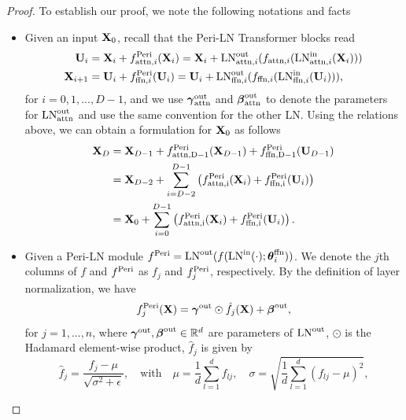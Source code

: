 \documentclass[journal]{IEEEtran}
\newcommand{\bfU}{{\bf U}}
\newcommand{\bfX}{{\bf X}}
\newcommand{\bftheta}{{\boldsymbol \theta}}
\newcommand{\bfgamma}{{\boldsymbol \gamma}}
\newcommand{\bfbeta}{{\boldsymbol \beta}}
\theoremstyle{plain}
\theoremstyle{definition}
\theoremstyle{remark}
\begin{document}
\begin{proof}
    To establish our proof, we note the following notations and facts
    \begin{itemize}
    \item Given an input $\bfX_0$, recall that the Peri-LN Transformer blocks read
        \begin{align}
        \bfU_{i} &= \bfX_i + f_{{\rm attn}, i}^{\rm Peri}(\bfX_i) = \bfX_i + {\rm LN}^{\rm out}_{{\rm attn}, i}(f_{{\rm attn}, i}({\rm LN}^{\rm in}_{{\rm attn}, i}(\bfX_i))) \\
     \bfX_{i+1} &= \bfU_{i} + f_{{\rm ffn}, i}^{\rm Peri}(\bfU_{i}) = \bfU_{i} + {\rm LN}_{{\rm ffn}, i}^{\rm out}(f_{{\rm ffn}, i}({\rm LN}_{{\rm ffn}, i}^{\rm in}(\bfU_{i}))), 
     \end{align}
     for $i=0,1,...,D-1$, and we use $\bfgamma^{\rm out}_{\rm attn}$ and $\bfbeta^{\rm out}_{\rm attn}$ to denote the parameters for ${\rm LN}^{\rm out}_{\rm attn}$ and use the same convention for the other LN. Using the relations above, we can obtain a formulation for $\bfX_0$ as follows
     \begin{align}
         \bfX_{D} &= \bfX_{D-1} + f_{\rm attn, D-1}^{\rm Peri}(\bfX_{D-1}) + f_{\rm ffn, D-1}^{\rm Peri}(\bfU_{D-1}) \\
         &= \bfX_{D-2} + \sum_{i=D-2}^{D-1} \left( f_{\rm attn, i}^{\rm Peri}(\bfX_{i}) + f_{\rm ffn, i}^{\rm Peri}(\bfU_{i})\right) \\
         &= \bfX_{0} + \sum_{i=0}^{D-1} \left( f_{\rm attn, i}^{\rm Peri}(\bfX_{i}) + f_{\rm ffn, i}^{\rm Peri}(\bfU_{i})\right) .\label{eq:expanded recursion}
     \end{align}
     \item Given a Peri-LN module $f^{\rm Peri} = {\rm LN}^{\rm out}(f({\rm LN}^{\rm in}(\cdot);\bftheta^{\rm ffn}_{i}))$. We denote the $j$th columns of $f$ and $f^{\rm Peri}$ as $f_j$ and $f^{\rm Peri}_j$, respectively. By the definition of layer normalization, we have 
     \begin{equation}\label{eq:f_j_LN_formula}
            f_j^{\rm Peri}(\bfX) = \bfgamma^{\rm out} \odot \hat{f}_j(\bfX) + \bfbeta^{\rm out},
        \end{equation}
        for $j=1,...,n$, where $\bfgamma^{\rm out}, \bfbeta^{\rm out} \in \mathbb{R}^d$ are parameters of ${\rm LN}^{\rm out}$, $\odot$ is the Hadamard element-wise product, $\hat{f}_j$ is given by
\begin{equation}\label{eq:standardized_f_appendix}
    \hat{f}_j = \frac{f_j - \mu}{\sqrt{\sigma^2 + \epsilon}}, \quad \text{with} \quad \mu = \frac{1}{d} \sum_{l=1}^d f_{lj}, \quad \sigma = \sqrt{\frac{1}{d} \sum_{l=1}^d (f_{lj} - \mu)^2},

\end{equation}
\end{itemize}
\end{proof}
\end{document}

